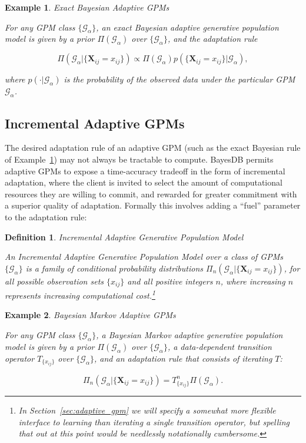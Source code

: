 \documentclass[10pt,letterpaper]{article}
\newtheorem{example}{Example}[section]
\newtheorem{definition}{Definition}[section]
\newcommand{\set}[1]{\{#1\}}
\newcommand{\G}{\mathcal{G}}
\newcommand{\T}{T}
\begin{document}
\begin{example} Exact Bayesian Adaptive GPMs

For any GPM class $\{\G_\alpha\}$, an \emph{exact Bayesian adaptive
  generative population model} is given by a prior
$\Pi(\G_\alpha)$ over
$\{\G_\alpha\}$, and the adaptation rule

\[ \Pi(\G_\alpha|\set{\mathbf{X}_{ij} = x_{ij}}) \propto \Pi(\G_\alpha)
 p(\set{\mathbf{X}_{ij} = x_{ij}}|\G_\alpha), \]

where $p(\cdot|\G_\alpha)$ is the probability of the observed data under
the particular GPM $\G_\alpha$. \label{ex:exact-bayes}
\end{example}

\subsection{Incremental Adaptive GPMs}
\label{sec:formalism-incremental-gpm}

The desired adaptation rule of an adaptive GPM (such as the exact
Bayesian rule of Example~\ref{ex:exact-bayes}) may not always be
tractable to compute.  BayesDB permits adaptive GPMs to expose a
time-accuracy tradeoff in the form of incremental adaptation, where
the client is invited to select the amount of computational resources
they are willing to commit, and rewarded for greater commitment with a
superior quality of adaptation.  Formally this involves adding a ``fuel''
parameter to the adaptation rule:

\begin{definition} Incremental Adaptive Generative Population Model
\label{def:incremental-adaptive}

An \emph{Incremental Adaptive Generative Population Model} over a
class of GPMs $\{\G_\alpha\}$ is a family of conditional probability
distributions $\Pi_n(\G_\alpha|\set{\mathbf{X}_{ij} = x_{ij}})$, for all
possible observation sets $\{x_{ij}\}$ and all positive integers $n$,
where increasing $n$ represents increasing computational
cost.\footnote{In Section~\ref{sec:adaptive_gpm} we will specify a
  somewhat more flexible interface to learning than iterating a single
  transition operator, but spelling that out at this point would be
  needlessly notationally cumbersome.}
\end{definition}

\begin{example} Bayesian Markov Adaptive GPMs

For any GPM class $\{\G_\alpha\}$, a \emph{Bayesian Markov adaptive
  generative population model} is given by a prior
$\Pi(\G_\alpha)$ over
$\{\G_\alpha\}$, a data-dependent transition operator
$\T_{\{x_{ij}\}}$ over $\{\G_\alpha\}$, and
an adaptation rule that consists of iterating $\T$:

\[ \Pi_n(\G_\alpha|\set{\mathbf{X}_{ij} = x_{ij}}) = \T_{\set{x_{ij}}}^n 
\Pi(\G_\alpha). \]
\label{ex:markov-bayes}
\end{example}
\end{document}
